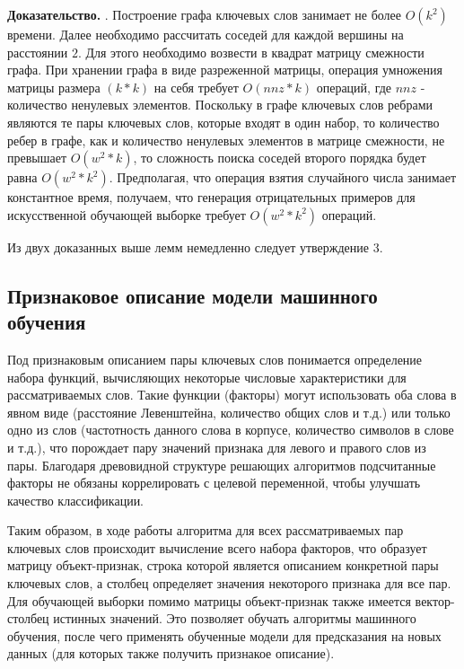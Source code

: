 \textbf{Доказательство.} 
. Построение графа ключевых слов занимает не более $O(k^2)$ времени. Далее необходимо рассчитать соседей для каждой вершины на расстоянии $2$. Для этого необходимо возвести в квадрат матрицу смежности графа. При хранении графа в виде разреженной матрицы, операция умножения матрицы размера $(k*k)$ на себя требует $O(nnz * k)$ операций, где $nnz$ - количество ненулевых элементов. Поскольку в графе ключевых слов ребрами являются те пары ключевых слов, которые входят в один набор, то количество ребер в графе, как и количество ненулевых элементов в матрице смежности, не превышает $O(w^2 * k)$, то сложность поиска соседей второго порядка будет равна $O(w^2 * k^2)$. Предполагая, что операция взятия случайного числа занимает константное время, получаем, что генерация отрицательных примеров для искусственной обучающей выборке требует $O(w^2 * k^2)$ операций.

Из двух доказанных выше лемм немедленно следует утверждение 3.

\subsection{Признаковое описание модели машинного обучения} \label{sec:features}
Под признаковым описанием пары ключевых слов понимается определение набора функций, вычисляющих некоторые числовые характеристики для рассматриваемых слов. Такие функции (факторы) могут использовать оба слова в явном виде (расстояние Левенштейна, количество общих слов и т.д.) или только одно из слов (частотность данного слова в корпусе, количество символов в слове и т.д.), что порождает пару значений признака для левого и правого слов из пары. Благодаря древовидной структуре решающих алгоритмов подсчитанные факторы не обязаны коррелировать с целевой переменной, чтобы улучшать качество классификации. 

Таким образом, в ходе работы алгоритма для всех рассматриваемых пар ключевых слов происходит вычисление всего набора факторов, что образует матрицу объект-признак, строка которой является описанием конкретной пары ключевых слов, а столбец определяет значения некоторого признака для все пар. Для обучающей выборки помимо матрицы объект-признак также имеется вектор-столбец истинных значений. Это позволяет обучать алгоритмы машинного обучения, после чего применять обученные модели для предсказания на новых данных (для которых также получить признакое описание). 



